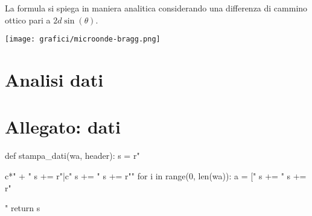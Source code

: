 La formula si spiega in maniera analitica considerando una differenza di cammino ottico pari a $2d\sin(\theta)$.


\texttt{[image: grafici/microonde-bragg.png]}

\section{Analisi dati}

\section{Allegato: dati}
\begin{sagesilent}
def stampa_dati(wa, header):
  s = r"\begin{tabular}{c*{" + "%
  s += r"}{|c}}"
  s += "%
  s += r"\midrule"
  for i in range(0, len(wa)):
    a = ["%
    s += "%
  s += r"\end{tabular}"
  return s
\end{sagesilent}

\begin{center}

\end{center}

